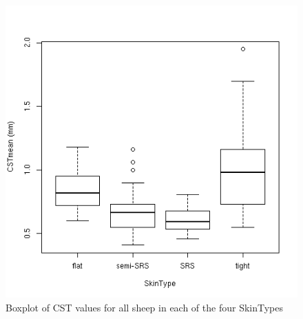 %

\begin{figure}[!h]
  \centering
  \includegraphics[width=1.0\textwidth]{CSTskintype.png}
  \caption{Boxplot of CST values for all sheep in each of the four SkinTypes}
  \label{fig:CSTskintype}
\end{figure}

%

